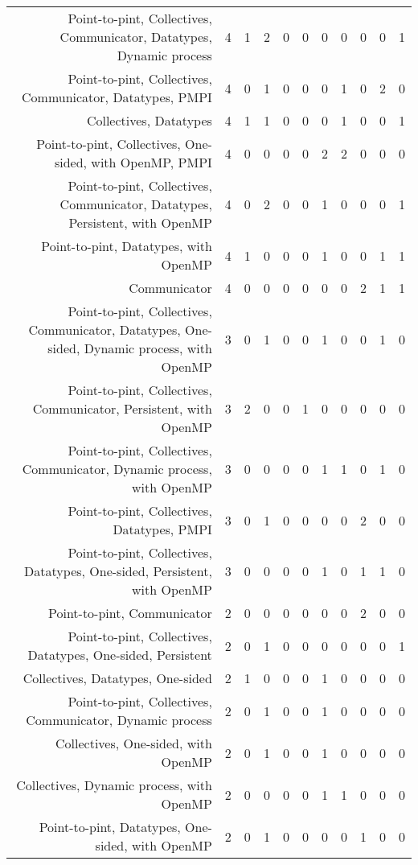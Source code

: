 {\begin{landscape}
\begin{longtable}[htb]{r|c|c|c|c|c|c|c|c|c|c}
{Point-to-pint, Collectives, Communicator, Datatypes, Dynamic process} & 4 & 1 & 2 & 0 & 0 & 0 & 0 & 0 & 0 & 1 \\%
{Point-to-pint, Collectives, Communicator, Datatypes, PMPI} & 4 & 0 & 1 & 0 & 0 & 0 & 1 & 0 & 2 & 0 \\%
{Collectives, Datatypes} & 4 & 1 & 1 & 0 & 0 & 0 & 1 & 0 & 0 & 1 \\%
{Point-to-pint, Collectives, One-sided, with OpenMP, PMPI} & 4 & 0 & 0 & 0 & 0 & 2 & 2 & 0 & 0 & 0 \\%
{Point-to-pint, Collectives, Communicator, Datatypes, Persistent, with OpenMP} & 4 & 0 & 2 & 0 & 0 & 1 & 0 & 0 & 0 & 1 \\%
{Point-to-pint, Datatypes, with OpenMP} & 4 & 1 & 0 & 0 & 0 & 1 & 0 & 0 & 1 & 1 \\%
{Communicator} & 4 & 0 & 0 & 0 & 0 & 0 & 0 & 2 & 1 & 1 \\%
{Point-to-pint, Collectives, Communicator, Datatypes, One-sided, Dynamic process, with OpenMP} & 3 & 0 & 1 & 0 & 0 & 1 & 0 & 0 & 1 & 0 \\%
{Point-to-pint, Collectives, Communicator, Persistent, with OpenMP} & 3 & 2 & 0 & 0 & 1 & 0 & 0 & 0 & 0 & 0 \\%
{Point-to-pint, Collectives, Communicator, Dynamic process, with OpenMP} & 3 & 0 & 0 & 0 & 0 & 1 & 1 & 0 & 1 & 0 \\%
{Point-to-pint, Collectives, Datatypes, PMPI} & 3 & 0 & 1 & 0 & 0 & 0 & 0 & 2 & 0 & 0 \\%
{Point-to-pint, Collectives, Datatypes, One-sided, Persistent, with OpenMP} & 3 & 0 & 0 & 0 & 0 & 1 & 0 & 1 & 1 & 0 \\%
{Point-to-pint, Communicator} & 2 & 0 & 0 & 0 & 0 & 0 & 0 & 2 & 0 & 0 \\%
{Point-to-pint, Collectives, Datatypes, One-sided, Persistent} & 2 & 0 & 1 & 0 & 0 & 0 & 0 & 0 & 0 & 1 \\%
{Collectives, Datatypes, One-sided} & 2 & 1 & 0 & 0 & 0 & 1 & 0 & 0 & 0 & 0 \\%
{Point-to-pint, Collectives, Communicator, Dynamic process} & 2 & 0 & 1 & 0 & 0 & 1 & 0 & 0 & 0 & 0 \\%
{Collectives, One-sided, with OpenMP} & 2 & 0 & 1 & 0 & 0 & 1 & 0 & 0 & 0 & 0 \\%
{Collectives, Dynamic process, with OpenMP} & 2 & 0 & 0 & 0 & 0 & 1 & 1 & 0 & 0 & 0 \\%
{Point-to-pint, Datatypes, One-sided, with OpenMP} & 2 & 0 & 1 & 0 & 0 & 0 & 0 & 1 & 0 & 0 \\%

\end{longtable}
\end{landscape}}
